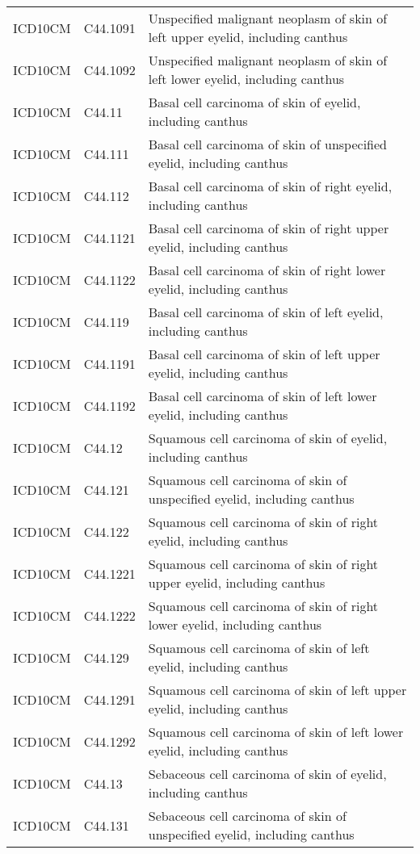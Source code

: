\begin{longtable}{p{}p{}p{}}
  ICD10CM & C44.1091 & Unspecified malignant neoplasm of skin of left upper eyelid, including canthus \\ 
  ICD10CM & C44.1092 & Unspecified malignant neoplasm of skin of left lower eyelid, including canthus \\ 
  ICD10CM & C44.11 & Basal cell carcinoma of skin of eyelid, including canthus \\ 
  ICD10CM & C44.111 & Basal cell carcinoma of skin of unspecified eyelid, including canthus \\ 
  ICD10CM & C44.112 & Basal cell carcinoma of skin of right eyelid, including canthus \\ 
  ICD10CM & C44.1121 & Basal cell carcinoma of skin of right upper eyelid, including canthus \\ 
  ICD10CM & C44.1122 & Basal cell carcinoma of skin of right lower eyelid, including canthus \\ 
  ICD10CM & C44.119 & Basal cell carcinoma of skin of left eyelid, including canthus \\ 
  ICD10CM & C44.1191 & Basal cell carcinoma of skin of left upper eyelid, including canthus \\ 
  ICD10CM & C44.1192 & Basal cell carcinoma of skin of left lower eyelid, including canthus \\ 
  ICD10CM & C44.12 & Squamous cell carcinoma of skin of eyelid, including canthus \\ 
  ICD10CM & C44.121 & Squamous cell carcinoma of skin of unspecified eyelid, including canthus \\ 
  ICD10CM & C44.122 & Squamous cell carcinoma of skin of right eyelid, including canthus \\ 
  ICD10CM & C44.1221 & Squamous cell carcinoma of skin of right upper eyelid, including canthus \\ 
  ICD10CM & C44.1222 & Squamous cell carcinoma of skin of right lower eyelid, including canthus \\ 
  ICD10CM & C44.129 & Squamous cell carcinoma of skin of left eyelid, including canthus \\ 
  ICD10CM & C44.1291 & Squamous cell carcinoma of skin of left upper eyelid, including canthus \\ 
  ICD10CM & C44.1292 & Squamous cell carcinoma of skin of left lower eyelid, including canthus \\ 
  ICD10CM & C44.13 & Sebaceous cell carcinoma of skin of eyelid, including canthus \\ 
  ICD10CM & C44.131 & Sebaceous cell carcinoma of skin of unspecified eyelid, including canthus \\ 

\end{longtable}
